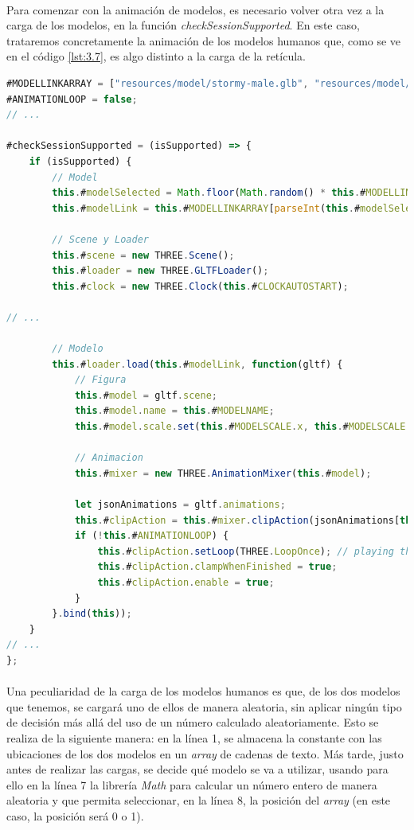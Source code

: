 \documentclass{subfiles}
\begin{document}
        \paragraph{}
        Para comenzar con la animación de modelos, es necesario volver otra vez a la carga de los modelos, en la función \textit{checkSessionSupported}. En este caso, trataremos concretamente la animación de los modelos humanos que, como se ve en el código \ref{lst:3.7}, es algo distinto a la carga de la retícula.

\begin{lstlisting}[language=JavaScript, caption={Carga de modelo humano.}, label={lst:3.7}]
#MODELLINKARRAY = ["resources/model/stormy-male.glb", "resources/model/stormie-female.glb"];
#ANIMATIONLOOP = false;
// ...

#checkSessionSupported = (isSupported) => {
    if (isSupported) {
        // Model
        this.#modelSelected = Math.floor(Math.random() * this.#MODELLINKARRAY.length);
        this.#modelLink = this.#MODELLINKARRAY[parseInt(this.#modelSelected)];

        // Scene y Loader
        this.#scene = new THREE.Scene();
        this.#loader = new THREE.GLTFLoader();
        this.#clock = new THREE.Clock(this.#CLOCKAUTOSTART);

// ...

        // Modelo
        this.#loader.load(this.#modelLink, function(gltf) {
            // Figura
            this.#model = gltf.scene;
            this.#model.name = this.#MODELNAME;
            this.#model.scale.set(this.#MODELSCALE.x, this.#MODELSCALE.y, this.#MODELSCALE.z);

            // Animacion
            this.#mixer = new THREE.AnimationMixer(this.#model);

            let jsonAnimations = gltf.animations;
            this.#clipAction = this.#mixer.clipAction(jsonAnimations[this.#MODELANIMATIONNUMBER]);
            if (!this.#ANIMATIONLOOP) {
                this.#clipAction.setLoop(THREE.LoopOnce); // playing the clip once
                this.#clipAction.clampWhenFinished = true;
                this.#clipAction.enable = true;
            }
        }.bind(this));
    } 
// ...
};
\end{lstlisting}

        \paragraph{}
        Una peculiaridad de la carga de los modelos humanos es que, de los dos modelos que tenemos, se cargará uno de ellos de manera aleatoria, sin aplicar ningún tipo de decisión más allá del uso de un número calculado aleatoriamente. Esto se realiza de la siguiente manera: en la línea 1, se almacena la constante con las ubicaciones de los dos modelos en un \textit{array} de cadenas de texto. Más tarde, justo antes de realizar las cargas, se decide qué modelo se va a utilizar, usando para ello en la línea 7 la librería \textit{Math} para calcular un número entero de manera aleatoria y que permita seleccionar, en la línea 8, la posición del \textit{array} (en este caso, la posición será 0 o 1).
\end{document}
